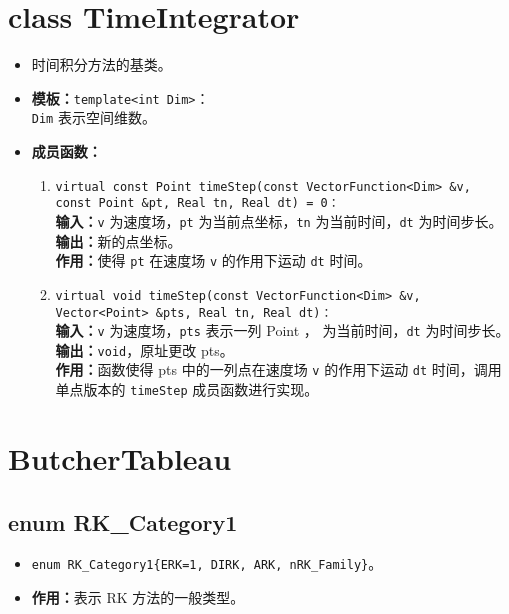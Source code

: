 \documentclass[a4paper,twoside]{ctexart}
\begin{document}
\section{class TimeIntegrator}
\begin{itemize}
    \item 时间积分方法的基类。
    \item \textbf{模板：}\texttt{template<int Dim>}：\\\texttt{Dim} 表示空间维数。
    \item \textbf{成员函数：}
            \begin{enumerate}[(1)]
                \item \texttt{virtual const Point timeStep(const VectorFunction<Dim> \&v, const Point \&pt, Real tn, Real dt) = 0：}\\
                \textbf{输入：}\texttt{v} 为速度场，\texttt{pt} 为当前点坐标，\texttt{tn} 为当前时间，\texttt{dt} 为时间步长。\\
                \textbf{输出：}新的点坐标。\\
                \textbf{作用：}使得 \texttt{pt} 在速度场 \texttt{v} 的作用下运动 \texttt{dt} 时间。
                \item \texttt{virtual void timeStep(const VectorFunction<Dim> \&v, Vector<Point> \&pts, Real tn, Real dt)：}\\
                \textbf{输入：}\texttt{v} 为速度场，\texttt{pts} 表示一列 Point ， 为当前时间，\texttt{dt} 为时间步长。\\
                \textbf{输出：}\texttt{void}，原址更改 pts。\\
                \textbf{作用：}函数使得 pts 中的一列点在速度场 \texttt{v} 的作用下运动 \texttt{dt} 时间，调用单点版本的 \texttt{timeStep} 成员函数进行实现。
            \end{enumerate}
\end{itemize}

\section{ButcherTableau}
\subsection{enum RK\_Category1}
\begin{itemize}
    \item \texttt{enum RK\_Category1\{ERK=1, DIRK, ARK, nRK\_Family\}}。
    \item \textbf{作用：}表示 RK 方法的一般类型。
\end{itemize}
\end{document}
